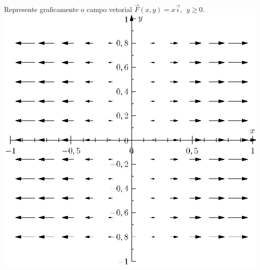 \begin{ex} Represente graficamente o campo vetorial $\vec{F}(x,y)=x\vec{i},~~y\geq 0$.
\includegraphics{cap_campos/figs/campo_exemplo_2}
\end{ex}

